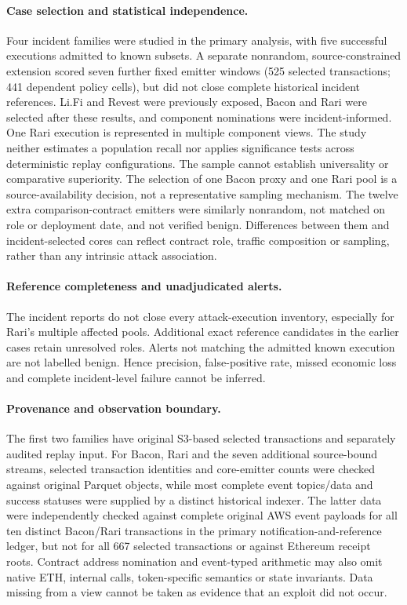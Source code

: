 \documentclass[preprint,12pt,authoryear]{elsarticle}
\begin{document}
\paragraph{Case selection and statistical independence.} Four incident families were studied in the primary analysis, with five successful executions admitted to known subsets. A separate nonrandom, source-constrained extension scored seven further fixed emitter windows (525 selected transactions; 441 dependent policy cells), but did not close complete historical incident references. Li.Fi and Revest were previously exposed, Bacon and Rari were selected after these results, and component nominations were incident-informed. One Rari execution is represented in multiple component views. The study neither estimates a population recall nor applies significance tests across deterministic replay configurations. The sample cannot establish universality or comparative superiority. The selection of one Bacon proxy and one Rari pool is a source-availability decision, not a representative sampling mechanism. The twelve extra comparison-contract emitters were similarly nonrandom, not matched on role or deployment date, and not verified benign. Differences between them and incident-selected cores can reflect contract role, traffic composition or sampling, rather than any intrinsic attack association.

\paragraph{Reference completeness and unadjudicated alerts.} The incident reports do not close every attack-execution inventory, especially for Rari's multiple affected pools. Additional exact reference candidates in the earlier cases retain unresolved roles. Alerts not matching the admitted known execution are not labelled benign. Hence precision, false-positive rate, missed economic loss and complete incident-level failure cannot be inferred.

\paragraph{Provenance and observation boundary.} The first two families have original S3-based selected transactions and separately audited replay input. For Bacon, Rari and the seven additional source-bound streams, selected transaction identities and core-emitter counts were checked against original Parquet objects, while most complete event topics/data and success statuses were supplied by a distinct historical indexer. The latter data were independently checked against complete original AWS event payloads for all ten distinct Bacon/Rari transactions in the primary notification-and-reference ledger, but not for all 667 selected transactions or against Ethereum receipt roots. Contract address nomination and event-typed arithmetic may also omit native ETH, internal calls, token-specific semantics or state invariants. Data missing from a view cannot be taken as evidence that an exploit did not occur.
\end{document}
